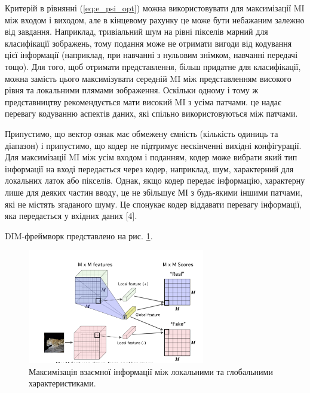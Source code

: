 
Критерій в рівнянні (\ref{eq:e_psi_opt})  можна використовувати для максимізації MI між входом і виходом, але в кінцевому рахунку це може бути небажаним залежно від завдання. Наприклад, тривіальний шум на рівні пікселів марний для класифікації зображень, тому подання може не отримати вигоди від кодування цієї інформації (наприклад, при навчанні з нульовим знімком, навчанні передачі тощо). Для того, щоб отримати представлення, більш придатне для класифікації, можна замість цього максимізувати середній MI між представленням високого рівня та локальними плямами зображення. Оскільки одному і тому ж представництву рекомендується мати високий MI з усіма патчами. це надає перевагу кодуванню аспектів даних, які спільно використовуються між патчами.

Припустимо, що вектор ознак має обмежену ємність (кількість одиниць та діапазон) і припустимо, що кодер не підтримує нескінченні вихідні конфігурації. Для максимізації MI між усім входом і поданням, кодер може вибрати який тип інформації на вході передається через кодер, наприклад, шум, характерний для локальних латок або пікселів. Однак, якщо кодер передає інформацію, характерну лише для деяких частин вводу, це не збільшує МІ з будь-якими іншими патчами, які не містять згаданого шуму. Це спонукає кодер віддавати перевагу інформації, яка передається у вхідних даних [4].

DIM-фреймворк представлено на рис. \ref{fig:deepinfo3}. 

\vspace{1em}


\begin{figure}[h]
  \includegraphics[width=\textwidth, height=5cm, natwidth=291, natheight=188]{Mal/deepinfo3.jpg}
  \caption{Максимізація взаємної інформації між локальними та глобальними характеристиками.}
  \label{fig:deepinfo3}
\end{figure}

